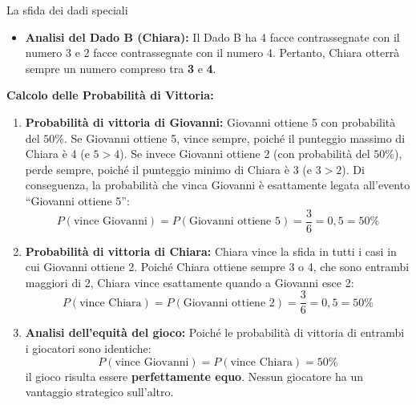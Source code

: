 \begin{esercizio}{La sfida dei dadi speciali}
\begin{soluzione}
\begin{itemize}
    \item \textbf{Analisi del Dado B (Chiara):}
    Il Dado B ha 4 facce contrassegnate con il numero 3 e 2 facce contrassegnate con il numero 4.
    Pertanto, Chiara otterrà sempre un numero compreso tra \textbf{3} e \textbf{4}.
  \end{itemize}

  \textbf{Calcolo delle Probabilità di Vittoria:}
  
  \begin{enumerate}[label=\alph*)]
    \item \textbf{Probabilità di vittoria di Giovanni:}
    Giovanni ottiene 5 con probabilità del $50\%$. Se Giovanni ottiene 5, vince sempre, poiché il punteggio massimo di Chiara è 4 (e $5 > 4$).
    Se invece Giovanni ottiene 2 (con probabilità del $50\%$), perde sempre, poiché il punteggio minimo di Chiara è 3 (e $3 > 2$).
    Di conseguenza, la probabilità che vinca Giovanni è esattamente legata all'evento ``Giovanni ottiene 5'':
    \[
    P(\text{vince Giovanni}) = P(\text{Giovanni ottiene 5}) = \frac{3}{6} = 0{,}5 = 50\%
    \]

    \item \textbf{Probabilità di vittoria di Chiara:}
    Chiara vince la sfida in tutti i casi in cui Giovanni ottiene 2. Poiché Chiara ottiene sempre 3 o 4, che sono entrambi maggiori di 2, Chiara vince esattamente quando a Giovanni esce 2:
    \[
    P(\text{vince Chiara}) = P(\text{Giovanni ottiene 2}) = \frac{3}{6} = 0{,}5 = 50\%
    \]

    \item \textbf{Analisi dell'equità del gioco:}
    Poiché le probabilità di vittoria di entrambi i giocatori sono identiche:
    \[
    P(\text{vince Giovanni}) = P(\text{vince Chiara}) = 50\%
    \]
    il gioco risulta essere \textbf{perfettamente equo}. Nessun giocatore ha un vantaggio strategico sull'altro.
  \end{enumerate}
\end{soluzione}
\end{esercizio}
